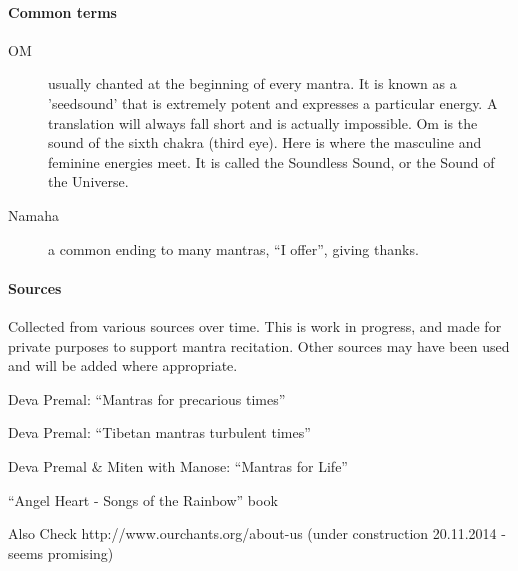 \begin{intersong}
  \paragraph{Common terms}
  \begin{description}
   \item[OM] usually chanted at the beginning of every mantra. It is known as a 'seedsound' that 
     is extremely potent and expresses a particular energy. A translation will always fall short 
     and is actually impossible. Om is the sound of the sixth chakra (third eye). Here is where 
     the masculine and feminine energies meet. It is called the Soundless Sound, or the Sound of 
     the Universe.
   \item[Namaha] a common ending to many mantras, “I offer”, giving thanks.
  \end{description}

  \paragraph{Sources}

  Collected from various sources over time. This is work in progress, and made for private 
  purposes to support mantra recitation. Other sources may have been used and will be added where 
  appropriate.

  \begin{description}
    \item[] Deva Premal: ``Mantras for precarious times'' 
    \item[] Deva Premal: ``Tibetan mantras turbulent times''
    \item[] Deva Premal \& Miten with Manose: ``Mantras for Life''
    \item[] ``Angel Heart - Songs of the Rainbow'' book
    \item Also Check http://www.ourchants.org/about-us (under construction 20.11.2014 - seems 
      promising)
  \end{description}  
\end{intersong}


